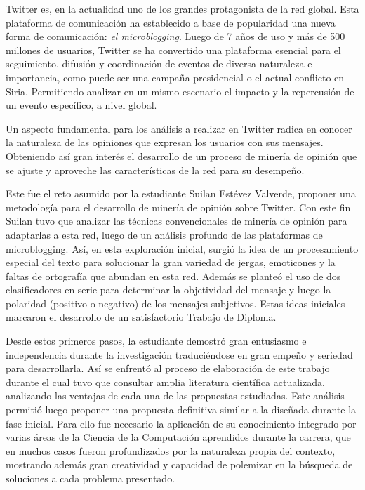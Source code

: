 \begin{opinion}

Twitter es, en la actualidad uno de los grandes protagonista de la red global. Esta plataforma de comunicación ha establecido a base de popularidad una nueva forma de comunicación: \emph{el microblogging}. Luego de 7 años de uso y más de 500 millones de usuarios, Twitter se ha convertido una plataforma esencial para el seguimiento, difusión y coordinación de eventos de diversa naturaleza e importancia, como puede ser una campaña presidencial o el actual conflicto en Siria. Permitiendo analizar en un mismo escenario el impacto y la repercusión de un evento específico, a nivel global.

Un aspecto fundamental para los análisis a realizar en Twitter radica en conocer la naturaleza de las opiniones que expresan los usuarios con sus mensajes. Obteniendo así gran interés el desarrollo de un proceso de minería de opinión que se ajuste y aproveche las características de la red para su desempeño.

Este fue el reto asumido por la estudiante Suilan Estévez Valverde, proponer una metodología para el desarrollo de minería de opinión sobre Twitter. Con este fin Suilan tuvo que analizar las técnicas convencionales de minería de opinión para adaptarlas a esta red, luego de un análisis profundo de las plataformas de microblogging. Así, en esta exploración inicial, surgió la idea de un procesamiento especial del texto para solucionar la gran variedad de jergas, emoticones y la faltas de ortografía que abundan en esta red. Además se planteó el uso de dos clasificadores en serie para determinar la objetividad del mensaje y luego la polaridad (positivo o negativo) 
de los mensajes subjetivos. Estas ideas iniciales marcaron el desarrollo de un satisfactorio Trabajo de Diploma.

Desde estos primeros pasos, la estudiante demostró gran entusiasmo e independencia durante la investigación traduciéndose en gran empeño y seriedad para desarrollarla. Así se enfrentó al proceso de elaboración de este trabajo durante el cual tuvo que consultar amplia literatura científica actualizada, analizando las ventajas de cada una de las propuestas estudiadas. Este análisis permitió luego proponer una propuesta definitiva similar a la diseñada durante la fase inicial. Para ello fue necesario la aplicación de su conocimiento integrado por varias áreas de la Ciencia de la Computación aprendidos durante la carrera, que en muchos casos fueron profundizados por la naturaleza propia del contexto, mostrando además gran creatividad y capacidad de polemizar en la búsqueda de soluciones a cada problema presentado.


\end{opinion}
